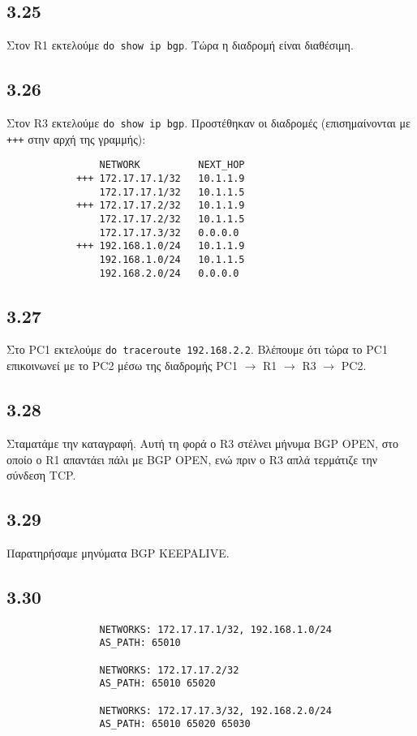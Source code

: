 \documentclass[a4paper, 12pt]{article}
\begin{document}
	\subsection*{3.25}
		Στον R1 εκτελούμε \verb|do show ip bgp|. Τώρα η διαδρομή είναι διαθέσιμη.

	\subsection*{3.26}
		Στον R3 εκτελούμε \verb|do show ip bgp|. Προστέθηκαν οι διαδρομές (επισημαίνονται με \verb|+++| στην αρχή της γραμμής):
		
		\begin{verbatim}
			    NETWORK          NEXT_HOP
			+++ 172.17.17.1/32   10.1.1.9
			    172.17.17.1/32   10.1.1.5
			+++ 172.17.17.2/32   10.1.1.9
			    172.17.17.2/32   10.1.1.5
			    172.17.17.3/32   0.0.0.0
			+++	192.168.1.0/24   10.1.1.9
			    192.168.1.0/24   10.1.1.5
			    192.168.2.0/24   0.0.0.0
		\end{verbatim}

	\subsection*{3.27}
		Στο PC1 εκτελούμε \verb|do traceroute 192.168.2.2|. Βλέπουμε ότι τώρα το PC1 επικοινωνεί με το PC2 μέσω της διαδρομής PC1 $\rightarrow$ R1 $\rightarrow$ R3 $\rightarrow$ PC2.

	\subsection*{3.28}
		Σταματάμε την καταγραφή. Αυτή τη φορά ο R3 στέλνει μήνυμα BGP OPEN, στο οποίο ο R1 απαντάει πάλι με BGP OPEN, ενώ πριν ο R3 απλά τερμάτιζε την σύνδεση TCP.

	\subsection*{3.29}
		Παρατηρήσαμε μηνύματα BGP KEEPALIVE.

	\subsection*{3.30}
		\begin{verbatim}
				NETWORKS: 172.17.17.1/32, 192.168.1.0/24	
				AS_PATH: 65010
				
				NETWORKS: 172.17.17.2/32
				AS_PATH: 65010 65020
				
				NETWORKS: 172.17.17.3/32, 192.168.2.0/24
				AS_PATH: 65010 65020 65030
		\end{verbatim}
\end{document}
